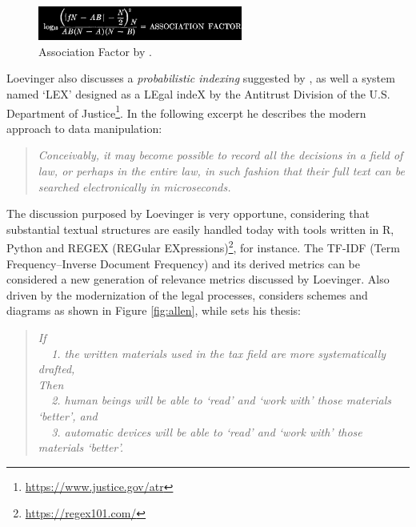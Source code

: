 \documentclass[a4paper]{exam}
\theoremstyle{plain}
\begin{document}
\begin{figure}[!h]
  \begin{center}
    \includegraphics[width=0.6\textwidth]{stiles.png}
  \caption{Association Factor by \cite{stiles1961association}.}
  \end{center}
\end{figure}

Loevinger also discusses a \textit{probabilistic indexing} suggested by \cite{maron1960relevance}, as well a system named `LEX' designed as a LEgal indeX by the Antitrust Division of the U.S. Department of Justice\footnote{ \url{https://www.justice.gov/atr}}. In the following excerpt he describes the modern approach to data manipulation:
\begin{quote}
\textit{Conceivably, it may become possible to record all the decisions in a field of law, or perhaps in the entire law, in such fashion that their full text can be searched electronically in microseconds.} \cite[p. 26]{loevinger1963jurimetrics}
\end{quote}

The discussion purposed by Loevinger is very opportune, considering that substantial textual structures are easily handled today with tools written in R, Python and REGEX (REGular EXpressions)\footnote{ \url{https://regex101.com/}}, for instance. The TF-IDF (Term Frequency--Inverse Document Frequency) \cite{sparck1972statistical} and its derived metrics \cite{lopes2016estimating} can be considered a new generation of relevance metrics discussed by Loevinger. Also driven by the modernization of the legal processes, \cite{allen1963modern}  considers schemes and diagrams as shown in Figure \ref{fig:allen}, while \cite{allen1963beyond} sets his thesis:
\begin{quote}
  \textit{If}
  \\ \smallskip
  $\;\;\;$ \textit{1. the written materials used in the tax field are more systematically drafted,}
  \\
  \textit{Then}
  \\ \smallskip
  $\;\;\;$ \textit{2. human beings will be able to `read' and `work with' those materials `better', and} 
  \\ \smallskip
  $\;\;\;$ \textit{3. automatic devices will be able to `read' and `work with' those materials `better'.}
  \begin{flushright} \cite[p. 714]{allen1963beyond}   \end{flushright}
\end{quote}
\end{document}
